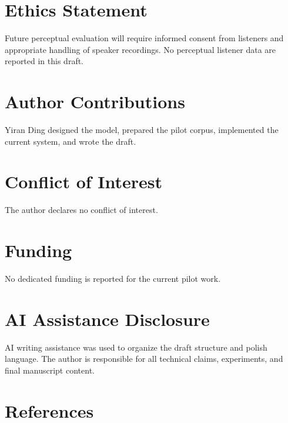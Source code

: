 \documentclass[
  10pt,
]{article}
\begin{document}
\section{Ethics Statement}\label{ethics-statement}

Future perceptual evaluation will require informed consent from
listeners and appropriate handling of speaker recordings. No perceptual
listener data are reported in this draft.

\section{Author Contributions}\label{author-contributions}

Yiran Ding designed the model, prepared the pilot corpus, implemented
the current system, and wrote the draft.

\section{Conflict of Interest}\label{conflict-of-interest}

The author declares no conflict of interest.

\section{Funding}\label{funding}

No dedicated funding is reported for the current pilot work.

\section{AI Assistance Disclosure}\label{ai-assistance-disclosure}

AI writing assistance was used to organize the draft structure and
polish language. The author is responsible for all technical claims,
experiments, and final manuscript content.

\section*{References}\label{references}
\end{document}
